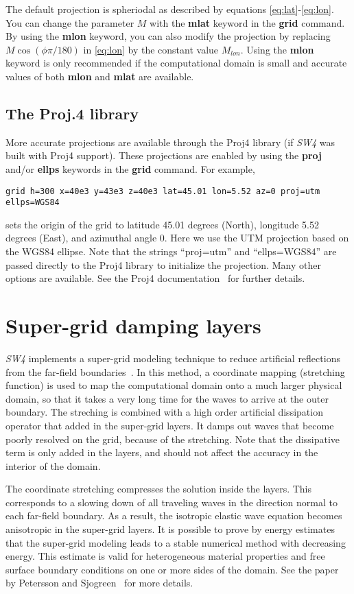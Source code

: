 \documentclass[11pt]{report}
\begin{document}
The default projection is spheriodal as described by equations \eqref{eq:lat}-\eqref{eq:lon}. You
can change the parameter $M$ with the {\bf mlat} keyword in the {\bf grid} command. By using the
{\bf mlon} keyword, you can also modify the projection by replacing $M\cos(\phi\pi/180)$ in
\eqref{eq:lon} by the constant value $M_{lon}$. Using the {\bf mlon} keyword is only recommended if
the computational domain is small and accurate values of both {\bf mlon} and {\bf mlat} are
available.

\subsection{The Proj.4 library}
More accurate projections are available through the Proj4 library (if
\emph{SW4} was built with Proj4 support). These projections are enabled by using the {\bf proj}
and/or {\bf ellps} keywords in the {\bf grid} command. For example,
\begin{verbatim}
grid h=300 x=40e3 y=43e3 z=40e3 lat=45.01 lon=5.52 az=0 proj=utm ellps=WGS84
\end{verbatim}
sets the origin of the grid to latitude 45.01 degrees (North), longitude 5.52 degrees (East), and
azimuthal angle 0. Here we use the UTM projection based on the WGS84 ellipse. Note that the strings
``proj=utm'' and ``ellps=WGS84'' are passed directly to the Proj4 library to initialize the
projection. Many other options are available. See the Proj4 documentation~\cite{Proj4} for further
details.

\section{Super-grid damping layers}

\emph{SW4} implements a super-grid modeling technique to reduce artificial reflections from the
far-field boundaries~\cite{AppCol-09, PetSjo-13}. In this method, a coordinate mapping (stretching
function) is used to map the computational domain onto a much larger physical domain, so that it
takes a very long time for the waves to arrive at the outer boundary. The streching is combined with
a high order artificial dissipation operator that added in the super-grid layers. It damps out waves
that become poorly resolved on the grid, because of the stretching. Note that the dissipative term
is only added in the layers, and should not affect the accuracy in the interior of the domain.

The coordinate stretching compresses the solution inside the layers. This corresponds to a slowing
down of all traveling waves in the direction normal to each far-field boundary. As a result, the
isotropic elastic wave equation becomes anisotropic in the super-grid layers. It is possible to
prove by energy estimates that the super-grid modeling leads to a stable numerical method with
decreasing energy. This estimate is valid for heterogeneous material properties and free surface
boundary conditions on one or more sides of the domain. See the paper by Petersson and
Sjogreen~\cite{PetSjo-13} for more details.
\end{document}
